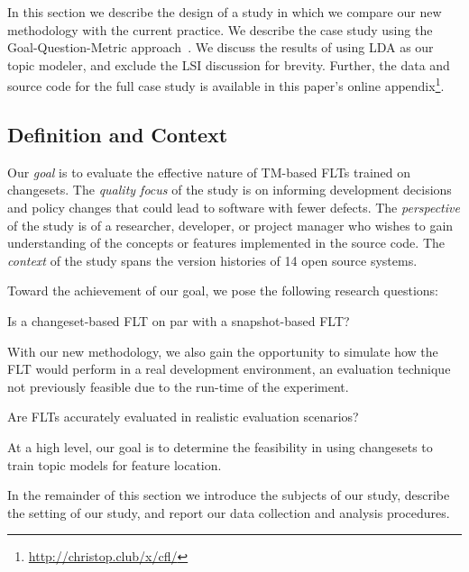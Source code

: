
In this section we describe the design of a study in which we compare our new
methodology with the current practice. We describe the case study using the
Goal-Question-Metric approach~\cite{Basili-etal:94}.  We discuss the results of
using LDA as our topic modeler, and exclude the LSI discussion for brevity.
Further, the data and source code for the full case study is available in this
paper's online appendix\footnote{\url{http://christop.club/x/cfl/}}.

\subsection{Definition and Context}

Our \textit{goal} is to evaluate the effective nature of TM-based FLTs trained
on changesets.  The \textit{quality focus} of the study is on informing
development decisions and policy changes that could lead to software with fewer
defects.  The \textit{perspective} of the study is of a researcher, developer,
or project manager who wishes to gain understanding of the concepts or features
implemented in the source code.  The \textit{context} of the study spans the
version histories of 14 open source systems.

Toward the achievement of our goal, we pose the following research questions:
\begin{description}[font=\itshape\mdseries,leftmargin=10mm,style=sameline]
    \item[RQ1] Is a changeset-based FLT on par with a snapshot-based FLT?
\end{description}

With our new methodology, we also gain the opportunity to simulate how the FLT
would perform in a real development environment, an evaluation technique
not previously feasible due to the run-time of the experiment.

\begin{description}[font=\itshape\mdseries,leftmargin=10mm,style=sameline]
    \item[RQ2] Are FLTs accurately evaluated in realistic evaluation scenarios?
\end{description}

At a high level, our goal is to determine the feasibility in using changesets
to train topic models for feature location.

In the remainder of this section we introduce the subjects of our study,
describe the setting of our study, and report our data collection and analysis procedures.

